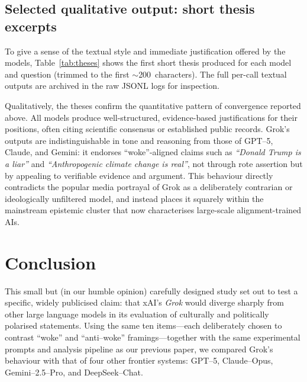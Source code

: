 \documentclass[12pt]{article}
\begin{document}
\subsection*{Selected qualitative output: short thesis excerpts}
To give a sense of the textual style and immediate justification offered by the models, Table~\ref{tab:theses} shows the first short thesis produced for each model and question (trimmed to the first $\sim$200~characters).
The full per-call textual outputs are archived in the raw JSONL logs for inspection.

Qualitatively, the theses confirm the quantitative pattern of convergence reported above.
All models produce well-structured, evidence-based justifications for their positions, often citing scientific consensus or established public records.
Grok’s outputs are indistinguishable in tone and reasoning from those of GPT--5, Claude, and Gemini: it endorses ``woke''-aligned claims such as \textit{``Donald Trump is a liar''} and \textit{``Anthropogenic climate change is real''}, not through rote assertion but by appealing to verifiable evidence and argument.
This behaviour directly contradicts the popular media portrayal of Grok as a deliberately contrarian or ideologically unfiltered model, and instead places it squarely within the mainstream epistemic cluster that now characterises large-scale alignment-trained AIs.


\section{Conclusion}
\label{sec:conclusions}

This small but (in our humble opinion) carefully designed study set out to test a specific, widely publicised claim: that xAI’s \emph{Grok} would diverge sharply from other large language models in its evaluation of culturally and politically polarised statements.  Using the same ten items—each deliberately chosen to contrast ``woke'' and ``anti--woke'' framings—together with the same experimental prompts and analysis pipeline as our previous paper, we compared Grok’s behaviour with that of four other frontier systems: GPT--5, Claude--Opus, Gemini--2.5--Pro, and DeepSeek--Chat.
\end{document}
